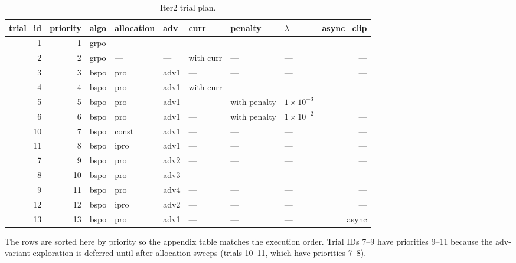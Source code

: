 \documentclass[11pt]{article}
\begin{document}
\begin{table}[h]
\centering
\caption{Iter2 trial plan.}
\label{tab:trials-raw}
\begin{tabular}{rrllllllr}
\toprule
trial\_id & priority & algo & allocation & adv & curr & penalty & $\lambda$ & async\_clip \\
\midrule
 1 &  1 & grpo & ---   & ---  & ---       & ---          & ---             & --- \\
 2 &  2 & grpo & ---   & ---  & with curr & ---          & ---             & --- \\
 3 &  3 & bspo & pro   & adv1 & ---       & ---          & ---             & --- \\
 4 &  4 & bspo & pro   & adv1 & with curr & ---          & ---             & --- \\
 5 &  5 & bspo & pro   & adv1 & ---       & with penalty & $1\!\times\!10^{-3}$ & --- \\
 6 &  6 & bspo & pro   & adv1 & ---       & with penalty & $1\!\times\!10^{-2}$ & --- \\
10 &  7 & bspo & const & adv1 & ---       & ---          & ---             & --- \\
11 &  8 & bspo & ipro  & adv1 & ---       & ---          & ---             & --- \\
 7 &  9 & bspo & pro   & adv2 & ---       & ---          & ---             & --- \\
 8 & 10 & bspo & pro   & adv3 & ---       & ---          & ---             & --- \\
 9 & 11 & bspo & pro   & adv4 & ---       & ---          & ---             & --- \\
12 & 12 & bspo & ipro  & adv2 & ---       & ---          & ---             & --- \\
13 & 13 & bspo & pro   & adv1 & ---       & ---          & ---             & async \\
\bottomrule
\end{tabular}
\end{table}

\noindent The rows are sorted here by priority so the appendix table
matches the execution order. Trial IDs 7--9 have priorities
9--11 because the adv-variant exploration is deferred until after
allocation sweeps (trials 10--11, which have priorities 7--8).
\end{document}
